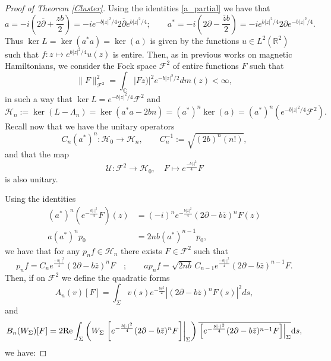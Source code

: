 \documentclass[11pt,a4paper,reqno,oneside]{amsproc}
\numberwithin{equation}{section}
\begin{document}
\begin{proof}[Proof of Theorem \ref{Cluster}]
Using the identities \eqref{a_partial} we have that  
\[
a = -i \left(2\overline{\partial} + \frac{zb}2 \right)= -i e^{-b|z|^2/4} 2\overline{\partial} e^{b|z|^2/4}; \qquad 
a^* = -i \left(2{\partial} - \frac{\overline{z} b}2\right)= -i e^{b|z|^2/4} 2{\partial} e^{-b|z|^2/4}.
\]
Thus 
$\ker L= \ker (a^*a) = \ker (a)$ is given by the functions $u \in L^2(\mathbb R^2)$ such that $f: z \mapsto e^{b|z|^2/4} u(z) $ is entire.
Then, as in previous works on magnetic Hamiltonians, we consider the Fock space $\mathcal F^2$ of entire functions $F$ such that
$$
\|F\|_{\mathcal{F}^2}^2=\int_{\mathbb C}|Fz)|^2 e^{-b|z|^2/2}dm(z)<\infty ,
$$
in such a way that $\ker L = e^{-b|z|^2/4} \mathcal F^2  $ and 
\[
\mathcal H_n:=
\ker (L-\Lambda_n)= \ker (a^*a - 2bn) = (a^*)^n \ker( a) = (a^*)^n \left( e^{-b|z|^2/4} \mathcal F^2  \right) . 
\]
Recall now that we have  the unitary operators 
\[
C_n (a^*)^n: \mathcal H_0 \to  \mathcal H_n, \qquad C_n^{-1} :=\sqrt{(2b)^{n}(n!)},
\]
and that the map
\[
\mathcal{U}:\mathcal{F}^{2} \to \mathcal{H}_0,\quad F\mapsto e^{\frac{-b|\cdot|^2}{4}} F
\]
is also unitary. 


Using  the identities
\begin{align*}
(a^{*})^{n} \left( e^{-\frac{b|\cdot|^{2}}{4}} F \right)(z)
&= (-i)^ne^{-\frac{b|z|^{2}}{4}} (2\partial-b\bar z)^{n} F(z)\\
a(a^{*})^{n} p_0 &= 2nb (a^{*})^{n-1} p_0,
\end{align*}
we have that for any $p_n f \in  \mathcal H_n$ there exists $F \in \mathcal{F}^{2}$ such that 
\[
p_n f = C_n e^{\frac{-b|\cdot|^2}{4}} (2\partial-b\bar z)^n  F \quad ; \qquad 
a p_n f = \sqrt{2 n b} \, C_{n-1} e^{\frac{-b|\cdot|^2}{4}} (2\partial-b\bar z)^{n-1}  F .
\]
Then, if on $\mathcal{F}^{2}$  we define the quadratic forms
\[
A_n(v)[F]
= \int_{\Sigma} v(s)
e^{-\frac{bs^{2}}{2}}
\left| (2\partial-b\bar z)^{n} F (s)\right|^2ds,
\]
and
\[
B_n(W_\Sigma)[F]=2{\rm Re} \int_{\Sigma} \left(W_\Sigma\left.\left[e^{-\frac{b|\cdot|^{2}}{4}} (2\partial-b\bar z)^{n} F\right]\right|_{\Sigma}\right)
\overline{ \left.\left[e^{-\frac{b|\cdot|^{2}}{4}} (2\partial-b\bar z)^{n-1} F\right]\right|_{\Sigma} } \mathrm{d} s,
\]
we have:




\end{proof}
\end{document}
